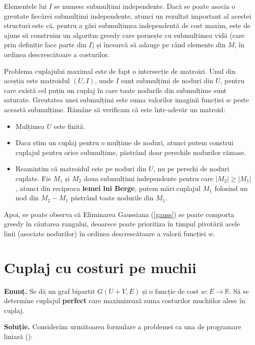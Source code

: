 Elementele lui $I$ se numesc submulțimi independente. Dacă se poate asocia o greutate fiecărei submulțimi independente, atunci un rezultat
important al acestei structuri este că, pentru a găsi submulțimea independentă de cost maxim, este de ajuns să construim un algoritm greedy
care pornește cu submulțimea vidă (care prin definiție face parte din $I$) și încearcă să adauge pe rând elemente din $M$, în ordinea descrescătoare
a costurilor.

Problema cuplajului maximal este de fapt o intersecție de matroizi. Unul din aceștia este matroidul $(U, I)$, unde $I$ sunt submulțimi de noduri
din $U$, pentru care există cel puțin un cuplaj în care toate nodurile din submulțime sunt saturate. Greutatea unei submulțimi este suma valorilor
imaginii funcției $w$ peste această submulțime. Rămâne să verificam că este într-adevăr un matroid:

\begin{itemize}
  \item Mulțimea $U$ este finită.
  \item Daca știm un cuplaj pentru o mulțime de noduri, atunci putem construi cuplajul pentru orice submulțime, păstrând doar perechile nodurilor
  rămase.
  \item Reamintim că matroidul este pe noduri din $U$, nu pe perechi de noduri cuplate. Fie $M_{1}$ și $M_{2}$ doua submulțimi independente pentru care
    $|M_{2}| \geq |M_{1}|$, atunci din reciproca \textbf{lemei lui Berge}, putem mări cuplajul $M_{1}$ folosind un nod din $M_{2} - M_{1}$ păstrând
    toate nodurile din $M_{1}$.
\end{itemize}

Apoi, se poate observa că Eliminarea Gaussiana (\ref{gauss}) se poate comporta greedy în căutarea rangului, deoarece poate prioritiza în timpul pivotării
acele linii (asociate nodurilor) în ordinea descrescătoare a valorii funcției $w$.

\pagebreak

\section{Cuplaj cu costuri pe muchii}

\noindent \textbf{Enunț.} Se dă un graf bipartit $G(U + V, E)$ și o funcție de cost $w \colon E \to \mathbb{R}$. Să se determine cuplajul
\textbf{perfect} care maximizează suma costurilor muchiilor alese în cuplaj.

\noindent \textbf{Soluție.} Considerăm următoarea formulare a problemei ca una de programare liniară (\cite{assignmentlp}):

